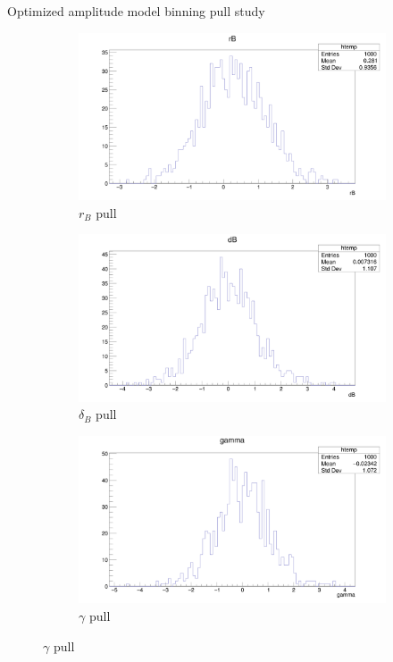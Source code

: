 \documentclass{beamer}
\begin{document}
\begin{frame}{Optimized amplitude model binning pull study}
  \begin{figure}
    \centering
    \vspace{-0.2cm}
    \begin{subfigure}{0.5\textwidth}
      \includegraphics[width = 1.0\textwidth]{OptimizedAmplitudePulls/rB1K1K.png}
      \caption{$r_B$ pull}
    \end{subfigure}%
    \begin{subfigure}{0.5\textwidth}
      \includegraphics[width = 1.0\textwidth]{OptimizedAmplitudePulls/dB1K1K.png}
      \caption{$\delta_B$ pull}
    \end{subfigure}
    \begin{subfigure}{0.5\textwidth}
      \includegraphics[width = 1.0\textwidth]{OptimizedAmplitudePulls/gamma1K1K.png}
      \caption{$\gamma$ pull}
    \end{subfigure}
  \end{figure}
\end{frame}
\end{document}
